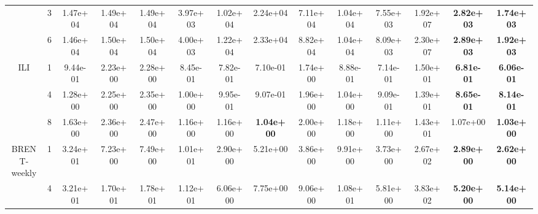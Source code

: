 \begin{table*}[!t]
{\begin{tabular}{cccccccccccccc}
                                     & 3                  & 1.47e+04                        & 1.49e+04                     & 1.49e+04                   & 3.97e+03                     & 1.02e+04          & 2.24e+04          & 7.11e+04 & 1.04e+04 & 7.55e+03          & 1.92e+07 & \textbf{2.82e+03} & \textbf{1.74e+03}\s \\ \cmidrule(l){3-14}
                                     & 6                  & 1.46e+04                        & 1.50e+04                     & 1.50e+04                   & 4.00e+03                     & 1.22e+04          & 2.33e+04          & 8.82e+04 & 1.04e+04 & 8.09e+03          & 2.30e+07 & \textbf{2.89e+03} & \textbf{1.92e+03}\s \\ \cmidrule(l){2-14}
            \multirow{3}{*}{ILI}     & 1                  & 9.44e-01                        & 2.23e+00                     & 2.28e+00                   & 8.45e-01                     & 7.82e-01          & 7.10e-01          & 1.74e+00 & 8.88e-01 & 7.14e-01          & 1.50e+01 & \textbf{6.81e-01} & \textbf{6.06e-01}\s \\ \cmidrule(l){3-14}
                                     & 4                  & 1.28e+00                        & 2.25e+00                     & 2.35e+00                   & 1.00e+00                     & 9.95e-01          & 9.07e-01          & 1.96e+00 & 1.04e+00 & 9.09e-01          & 1.39e+01 & \textbf{8.65e-01} & \textbf{8.14e-01}\s \\ \cmidrule(l){3-14}
                                     & 8                  & 1.63e+00                        & 2.36e+00                     & 2.47e+00                   & 1.16e+00                     & 1.16e+00          & \textbf{1.04e+00} & 2.00e+00 & 1.18e+00 & 1.11e+00          & 1.43e+01 & 1.07e+00          & \textbf{1.03e+00}\s \\ \cmidrule(l){2-14}
            \multirowcell{3}{BRENT-\\weekly} & 1                  & 3.24e+01                        & 7.23e+00                     & 7.49e+00                   & 1.01e+01                     & 2.90e+00          & 5.21e+00          & 3.86e+00 & 9.91e+00 & 3.73e+00          & 2.67e+02 & \textbf{2.89e+00} & \textbf{2.62e+00}\s \\ \cmidrule(l){3-14}
                                     & 4                  & 3.21e+01                        & 1.70e+01                     & 1.78e+01                   & 1.12e+01                     & 6.06e+00          & 7.75e+00          & 9.06e+00 & 1.08e+01 & 5.81e+00          & 3.83e+02 & \textbf{5.20e+00} & \textbf{5.14e+00}\s \\ \cmidrule(l){3-14}

\end{tabular}}
\end{table*}
